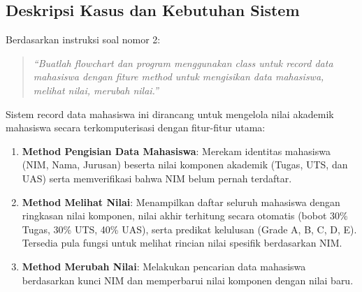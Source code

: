 \documentclass[12pt,a4paper]{article}
\begin{document}
\subsection{Deskripsi Kasus dan Kebutuhan Sistem}
Berdasarkan instruksi soal nomor 2:
\begin{quote}
\textit{``Buatlah flowchart dan program menggunakan class untuk record data mahasiswa dengan fiture method untuk mengisikan data mahasiswa, melihat nilai, merubah nilai.''}
\end{quote}

Sistem record data mahasiswa ini dirancang untuk mengelola nilai akademik mahasiswa secara terkomputerisasi dengan fitur-fitur utama:
\begin{enumerate}
    \item \textbf{Method Pengisian Data Mahasiswa}: Merekam identitas mahasiswa (NIM, Nama, Jurusan) beserta nilai komponen akademik (Tugas, UTS, dan UAS) serta memverifikasi bahwa NIM belum pernah terdaftar.
    \item \textbf{Method Melihat Nilai}: Menampilkan daftar seluruh mahasiswa dengan ringkasan nilai komponen, nilai akhir terhitung secara otomatis (bobot 30\% Tugas, 30\% UTS, 40\% UAS), serta predikat kelulusan (Grade A, B, C, D, E). Tersedia pula fungsi untuk melihat rincian nilai spesifik berdasarkan NIM.
    \item \textbf{Method Merubah Nilai}: Melakukan pencarian data mahasiswa berdasarkan kunci NIM dan memperbarui nilai komponen dengan nilai baru.
\end{enumerate}
\end{document}
